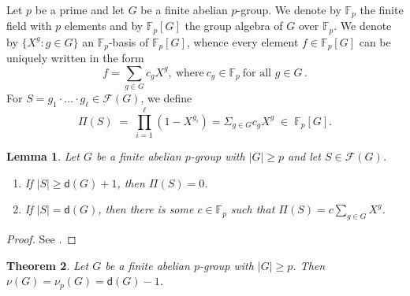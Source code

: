 \documentclass[a4paper, 10pt]{amsart}
\theoremstyle{plain}
\newtheorem{theorem}{\bf Theorem}[section]
\newtheorem{lemma}[theorem]{\bf Lemma}
\theoremstyle{definition}
\newcommand{\F}{\mathbb F}
\numberwithin{equation}{section}
\begin{document}
Let $p$ be a prime and let $G$ be a finite abelian $p$-group. We denote by $\F_p$ the finite field with $p$ elements and by  $\F_p[G]$  the group algebra of $G$ over $\F_p$. We denote by  $\{X^g \colon g \in G \}$  an $\F_p$-basis of $\F_p [G]$, whence every element $f \in \F_p [G]$ can be uniquely written in the form
\[
f = \sum_{g \in G} c_gX^g, \ \text{where} \ c_g \in \F_p \ \text{for all $g \in G$} \,.
\]
For 
$S = g_1 \cdot \ldots \cdot g_\ell \in \mathcal{F}(G)$, we define
\[
\Pi(S) \;=\; \prod_{i=1}^{\ell}(1 - X^{g_i})=\Sigma_{g\in G} c_g X^g \;\in\; \mathbb{F}_p[G].
\]


\begin{lemma} \label{3.4}
Let $G$ be a finite abelian $p$-group with $|G| \ge p$ and let $S \in \mathcal F (G)$.
\begin{enumerate}
\item If $|S| \ge \mathsf d (G)+1$, then $\Pi (S) = 0$.

\item If $|S| = \mathsf d (G)$, then there is some $c \in \F_p$ such that $\Pi (S) = c \sum_{g \in G} X^g$.
\end{enumerate}
\end{lemma}

\begin{proof}
See \cite[Proposition 5.5.8]{Ge-HK06a}.
\end{proof}


\begin{theorem} \label{3.5}
Let $G$ be a finite abelian $p$-group with $|G| \ge p$. Then $\nu (G) = \nu_p (G) = \mathsf d (G)-1$.
\end{theorem}
\end{document}
